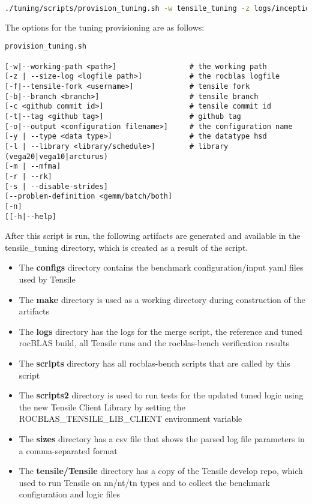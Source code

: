 \documentclass[]{article}
\begin{document}
\begin{lstlisting}[language=bash,breaklines=true]
./tuning/scripts/provision_tuning.sh -w tensile_tuning -z logs/inception-rocblas-configs_unique.log -o tf_inception.yaml -y sgemm -l vega20
\end{lstlisting}

\noindent
The options for the tuning provisioning are as follows:

\begin{verbatim}
provision_tuning.sh

[-w|--working-path <path>]                 # the working path
[-z | --size-log <logfile path>]           # the rocblas logfile
[-f|--tensile-fork <username>]             # tensile fork
[-b|--branch <branch>]                     # tensile branch
[-c <github commit id>]                    # tensile commit id
[-t|--tag <github tag>]                    # github tag
[-o|--output <configuration filename>]     # the configuration name
[-y | --type <data type>]                  # the datatype hsd
[-l | --library <library/schedule>]        # library (vega20|vega10|arcturus)
[-m | --mfma]
[-r | --rk]
[-s | --disable-strides]
[--problem-definition <gemm/batch/both]
[-n]
[[-h|--help]

\end{verbatim}

After this script is run, the following artifacts are generated and available in the tensile\_tuning directory, which is created as a result of the script.

\begin{itemize}


 \item The \textbf{configs} directory contains the benchmark configuration/input yaml files used by Tensile

 \item The \textbf{make} directory is used as a working directory during construction of the artifacts

 \item The \textbf{logs} directory has the logs for the merge script, the reference and tuned rocBLAS build, all Tensile runs and the rocblas-bench verification results

 \item The \textbf{scripts} directory has all rocblas-bench scripts that are called by this script

 \item The \textbf{scripts2} directory is used to run tests for the updated tuned logic using the new Tensile Client Library by setting the \\ROCBLAS\_TENSILE\_LIB\_CLIENT environment variable

 \item The \textbf{sizes} directory has a csv file that shows the parsed log file parameters in a comma-separated format

 \item The \textbf{tensile/Tensile} directory has a copy of the Tensile develop repo, which used to run Tensile on nn/nt/tn types and to collect the benchmark configuration and logic files

\end{itemize}
\end{document}
